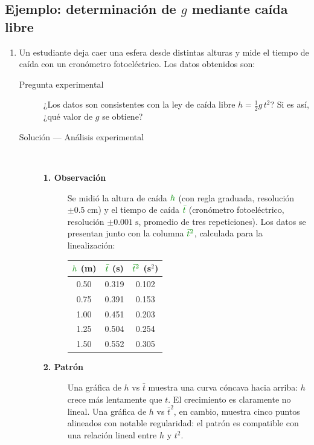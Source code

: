 \documentclass[11pt]{book}
\newcommand{\dato}[1]{\textcolor{colDatos}{#1}}
\begin{document}
\subsection*{Ejemplo: determinación de $g$ mediante caída libre}

\begin{enumerate}
\item Un estudiante deja caer una esfera desde distintas alturas y mide el tiempo de caída con un cronómetro fotoeléctrico. Los datos obtenidos son:

\begin{description}
\item[Pregunta experimental]
¿Los datos son consistentes con la ley de caída libre $h = \tfrac{1}{2}g\,t^2$? Si es así, ¿qué valor de $g$ se obtiene?

\item[Solución --- Análisis experimental]~

\begin{description}
    \item[\textbf{1. Observación}]
    Se midió la altura de caída $\dato{h}$ (con regla graduada, resolución $\pm 0.5\;\text{cm}$) y el tiempo de caída $\dato{\bar{t}}$ (cronómetro fotoeléctrico, resolución $\pm 0.001\;\text{s}$, promedio de tres repeticiones). Los datos se presentan junto con la columna $\dato{\bar{t}^2}$, calculada para la linealización:

    \medskip
    \begin{center}
    \small
    \begin{tabular}{ccc}
    \hline
    $\dato{h}$ (m) & $\dato{\bar{t}}$ (s) & $\dato{\bar{t}^2}$ (s$^2$) \\
    \hline
    0.50 & 0.319 & 0.102 \\
    0.75 & 0.391 & 0.153 \\
    1.00 & 0.451 & 0.203 \\
    1.25 & 0.504 & 0.254 \\
    1.50 & 0.552 & 0.305 \\
    \hline
    \end{tabular}
    \end{center}

    \item[\textbf{2. Patrón}]
    Una gráfica de $h$ vs $\bar{t}$ muestra una curva cóncava hacia arriba: $h$ crece más lentamente que $t$. El crecimiento es claramente no lineal. Una gráfica de $h$ vs $\bar{t}^2$, en cambio, muestra cinco puntos alineados con notable regularidad: el patrón es compatible con una relación lineal entre $h$ y $t^2$.


\end{description}
\end{description}
\end{enumerate}
\end{document}
